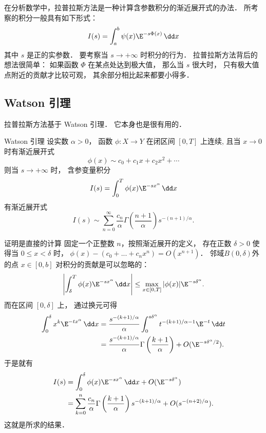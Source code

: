 

在分析数学中，拉普拉斯方法是一种计算含参数积分的渐近展开式的办法． 所考察的积分一般具有如下形式：
\begin{equation}\label{LapAsm_eq1}
I(s)=\int_a^b\psi(x)\E^{-s\Phi(x)}\,\dd x
\end{equation}
其中 $s$ 是正的实参数． 要考察当 $s\to+\infty$ 时积分的行为． 拉普拉斯方法背后的想法很简单： 如果函数 $\Phi$ 在某点处达到极大值， 那么当 $s$ 很大时， 只有极大值点附近的贡献才比较可观， 其余部分相比起来都要小得多．

\subsection{Watson 引理}
拉普拉斯方法基于 Watson 引理． 它本身也是很有用的．

\begin{lemma}{Watson 引理}
设实数 $\alpha>0$， 函数 $\phi:X\to Y$ 在闭区间 $[0,T]$ 上连续, 且当 $x\to0$ 时有渐近展开式
\[
  \phi(x)\sim c_0+c_1x+c_2x^2+\cdots
\]
则当 $s\to+\infty$ 时， 含参变量积分
\[
  I(s)=\int_0^T \phi(x)\E^{-s x^\alpha}\,\dd x
\]
有渐近展开式
\[
  I(s)\sim\sum_{n=0}^\infty \frac{c_n}{\alpha}\Gamma\left(\frac{n+1}{\alpha}\right)s^{-(n+1)/\alpha}.
\]
\end{lemma}

证明是直接的计算 固定一个正整数 $n$，按照渐近展开的定义， 存在正数 $\delta >0$ 使得当 $0\leq x<\delta$ 时， $\phi(x)-(c_0+...+c_nx^n)=O(x^{n+1})$． 邻域$B(0,\delta)$外的点 $x\in[0,b]$ 对积分的贡献是可以忽略的：
\[
  \left|\int_\delta^T\phi(x)\E^{-sx^\alpha}\,\dd x\right|
\leq\max_{x\in[0,T]}|\phi(x)|\E^{-s\delta^\alpha}.
\]
而在区间 $[0,\delta]$ 上， 通过换元可得
$$
\begin{aligned}
\int_0^\delta x^k\E^{-tx^\alpha}\,\dd x
&=\frac{s^{-(k+1)/\alpha}}{\alpha}\int_0^{s\delta^\alpha}t^{-(k+1)/\alpha-1}\E^{-t}\,\dd t\\
&=\frac{s^{-(k+1)/\alpha}}{\alpha}\Gamma\left(\frac{k+1}{\alpha}\right)+O(\E^{-s\delta^\alpha/2}).
\end{aligned}
$$
于是就有
$$
\begin{aligned}
I(s)
&=\int_0^\delta\phi(x)\E^{-sx^\alpha}\,\dd x+O(\E^{-s\delta^\alpha})\\
&=\sum_{k=0}^n\frac{c_n}{\alpha}\Gamma\left(\frac{k+1}{\alpha}\right)s^{-(k+1)/\alpha}+O(s^{-(n+2)/\alpha}).
\end{aligned}
$$
这就是所求的结果．

